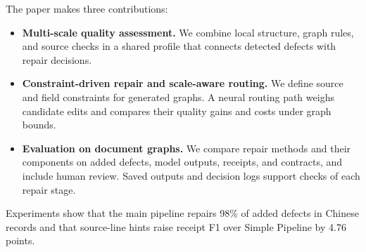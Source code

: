 The paper makes three contributions:
\begin{itemize}
    \item \textbf{Multi-scale quality assessment.}
    We combine local structure, graph rules, and source checks in a shared
    profile that connects detected defects with repair decisions.
    \item \textbf{Constraint-driven repair and scale-aware routing.}
    We define source and field constraints for generated graphs.
    A neural routing path weighs candidate edits and compares their
    quality gains and costs under graph bounds.
    \item \textbf{Evaluation on document graphs.}
    We compare repair methods and their components on added defects,
    model outputs, receipts, and contracts, and include human review.
    Saved outputs and decision logs support checks of each repair stage.
\end{itemize}

Experiments show that the main pipeline repairs 98\% of added defects in
Chinese records and that source-line hints raise receipt F1 over Simple
Pipeline by 4.76 points.
